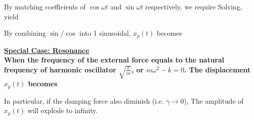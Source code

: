 \documentclass[class=article, crop=false, 12pt]{standalone}
\begin{document}
By matching coefficients of $\cos{\omega t}$ and $\sin{\omega t}$ respectively, we require
Solving, yield

By combining $\sin/\cos$ into 1 sinusoidal, $x_p(t)$ becomes


\bf{\ul{Special Case: Resonance}}\\

When the frequency of the external force equals to the natural frequency of harmonic oscillator $\sqrt{\frac{k}{m}}$, 
or $m\omega^2 -k = 0$. 
The displacement $x_p(t)$ becomes

In particular, if the damping force also diminish (i.e. $\gamma \to 0$), 
The amplitude of $x_p(t)$ will explode to infinity. 

\theend
\end{document}
